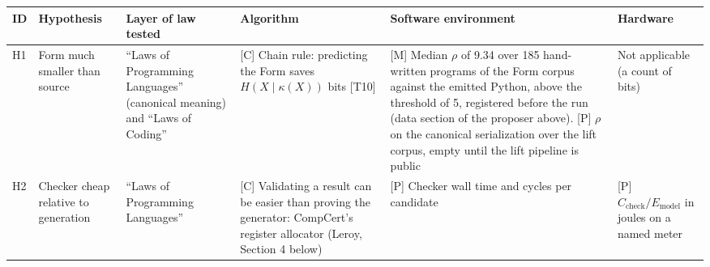 \documentclass[10pt,letterpaper]{article}
\begin{document}
{\scriptsize\setlength{\tabcolsep}{3.0pt}\renewcommand{\arraystretch}{1.14}
\begin{longtable}[]{@{}
  >{\raggedright\arraybackslash}p{}
  >{\raggedright\arraybackslash}p{}
  >{\raggedright\arraybackslash}p{}
  >{\raggedright\arraybackslash}p{}
  >{\raggedright\arraybackslash}p{}
  >{\raggedright\arraybackslash}p{}@{}}
\toprule\noalign{}
\begin{minipage}[b]{\linewidth}\raggedright
\textbf{ID}
\end{minipage} & \begin{minipage}[b]{\linewidth}\raggedright
\textbf{Hypothesis}
\end{minipage} & \begin{minipage}[b]{\linewidth}\raggedright
\textbf{Layer of law tested}
\end{minipage} & \begin{minipage}[b]{\linewidth}\raggedright
\textbf{Algorithm}
\end{minipage} & \begin{minipage}[b]{\linewidth}\raggedright
\textbf{Software environment}
\end{minipage} & \begin{minipage}[b]{\linewidth}\raggedright
\textbf{Hardware}
\end{minipage} \\
\midrule\noalign{}
\endhead
\bottomrule\noalign{}
\endlastfoot
H1 & Form much smaller than source & ``Laws of Programming Languages''
(canonical meaning) and ``Laws of Coding'' & {[}C{]} Chain rule:
predicting the Form saves \(H(X\mid\kappa(X))\) bits {[}T10{]} & {[}M{]}
Median \(\rho\) of 9.34 over 185 hand-written programs of the Form
corpus against the emitted Python, above the threshold of 5, registered
before the run (data section of the proposer above). {[}P{]} \(\rho\) on
the canonical serialization over the lift corpus, empty until the lift
pipeline is public & Not applicable (a count of bits) \\
H2 & Checker cheap relative to generation & ``Laws of Programming
Languages'' & {[}C{]} Validating a result can be easier than proving the
generator: CompCert's register allocator (Leroy, Section 4 below) &
{[}P{]} Checker wall time and cycles per candidate & {[}P{]}
\(C_{\text{check}}/E_{\text{model}}\) in joules on a named meter \\

\end{longtable}}
\end{document}
